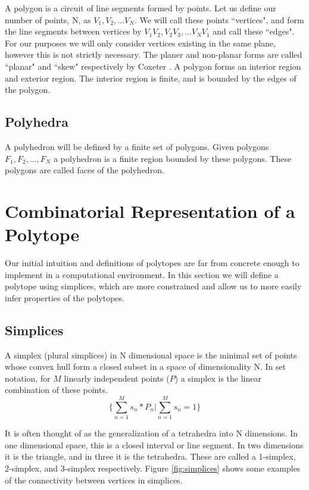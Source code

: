 A polygon is a circuit of line segments formed by points. Let us define our
number of points, N, as $V_1, V_2, ... V_N$. We will call these points
``vertices", and form the line segments between vertices by
$V_1 V_2, V_2 V_3, ... V_N V_1$
and call these ``edges". For our purposes we will only consider vertices existing
in the same plane, however this is not strictly necessary. The planer and
non-planar forms are called ``planar" and ``skew" respectively by Coxeter
\cite{Coxeter}.
A polygon forms an interior region and exterior region. The interior region
is finite, and is bounded by the edges of the polygon.

\subsection{Polyhedra}

A polyhedron will be defined by a finite set of polygons. Given polygons
$F_1, F_2, ..., F_N$ a polyhedron is a finite region bounded by these polygons.
These polygons are called faces of the polyhedron. 


\section{Combinatorial Representation of a Polytope}

Our initial intuition and definitions of polytopes are far from concrete enough to
implement in a computational environment. In this section we will define a
polytope using simplices, which are more constrained and allow us to
more easily infer properties of the polytopes.

\subsection{Simplices}

A simplex (plural simplices) in N dimensional space is the minimal set of
points whose convex hull form a closed subset in a space of dimensionality N.
In set notation, for $M$ linearly independent points ($P$) a simplex is the
linear combination of these points.
\begin{equation}
\{\sum_{n=1}^{M}s_n*P_n | \sum_{n=1}^{M} s_n = 1\}
\end{equation}

It is often thought
of as the generalization of a tetrahedra into N dimensions. In one dimensional
space, this is a closed interval or line segment. In two dimensions it is the
triangle, and in three it is the tetrahedra. These are called a 1-simplex,
2-simplex, and 3-simplex respectively. Figure \ref{fig:simplices} shows
some examples of the connectivity between vertices in simplices.


